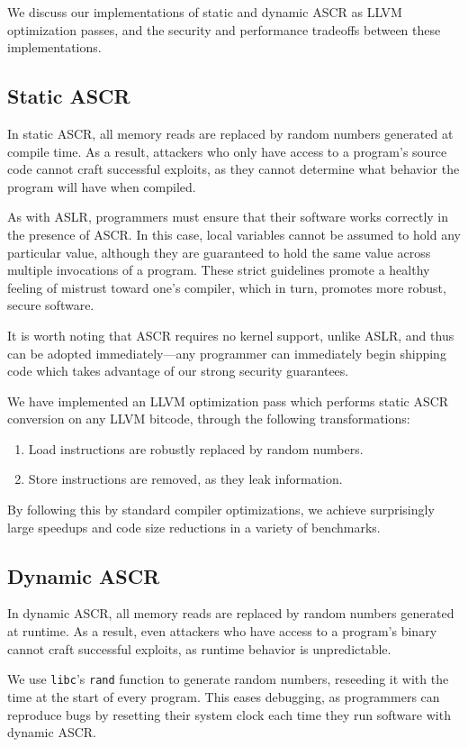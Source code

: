 \documentclass[10pt,twocolumn]{article}
\renewcommand{\t}{\texttt}
\begin{document}
We discuss our implementations of static and dynamic ASCR as LLVM optimization
passes, and the security and performance tradeoffs between these
implementations.

\subsection{Static ASCR}

In static ASCR, all memory reads are replaced by random numbers generated at
compile time. As a result, attackers who only have access to a program's source
code cannot craft successful exploits, as they cannot determine what behavior
the program will have when compiled.

As with ASLR, programmers must ensure that their software works correctly in the
presence of ASCR. In this case, local variables cannot be assumed to hold any
particular value, although they are guaranteed to hold the same value across
multiple invocations of a program. These strict guidelines promote a healthy
feeling of mistrust toward one's compiler, which in turn, promotes more robust,
secure software.

It is worth noting that ASCR requires no kernel support, unlike ASLR, and thus
can be adopted immediately---any programmer can immediately begin shipping code
which takes advantage of our strong security guarantees.

We have implemented an LLVM optimization pass which performs static ASCR
conversion on any LLVM bitcode, through the following transformations:
\begin{enumerate}
\item Load instructions are robustly replaced by random numbers.
\item Store instructions are removed, as they leak information.
\end{enumerate}
By following this by standard compiler optimizations, we achieve surprisingly
large speedups and code size reductions in a variety of benchmarks.

\subsection{Dynamic ASCR}

In dynamic ASCR, all memory reads are replaced by random numbers generated at
runtime. As a result, even attackers who have access to a program's binary
cannot craft successful exploits, as runtime behavior is unpredictable.

We use \t{libc}'s \t{rand} function to generate random numbers, reseeding it
with the time at the start of every program. This eases debugging, as
programmers can reproduce bugs by resetting their system clock each time they
run software with dynamic ASCR.
\end{document}
